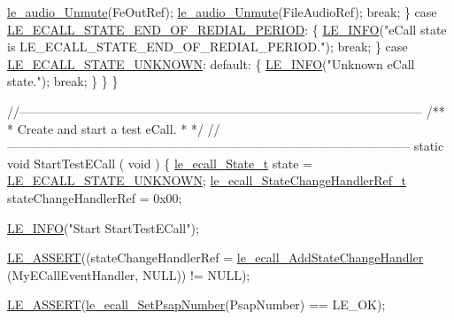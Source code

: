 \begin{DoxyCodeInclude}
{{{{{{{{            \hyperlink{le__audio__interface_8h_adad24547293481964039efe56bc14e2b}{le\_audio\_Unmute}(FeOutRef);
            \hyperlink{le__audio__interface_8h_adad24547293481964039efe56bc14e2b}{le\_audio\_Unmute}(FileAudioRef);
            \textcolor{keywordflow}{break};
        \}
        \textcolor{keywordflow}{case} \hyperlink{le__ecall__interface_8h_a233609e4724e549a1405f9177c0a07ddac5c297a2a70f2490f4f65d72b3a74481}{LE\_ECALL\_STATE\_END\_OF\_REDIAL\_PERIOD}:
        \{
            \hyperlink{le__log_8h_a23e6d206faa64f612045d688cdde5808}{LE\_INFO}(\textcolor{stringliteral}{"eCall state is LE\_ECALL\_STATE\_END\_OF\_REDIAL\_PERIOD."});
            \textcolor{keywordflow}{break};
        \}
        \textcolor{keywordflow}{case} \hyperlink{le__ecall__interface_8h_a233609e4724e549a1405f9177c0a07dda5c06f82cbeeebb121ab56920a67dbc91}{LE\_ECALL\_STATE\_UNKNOWN}:
        \textcolor{keywordflow}{default}:
        \{
            \hyperlink{le__log_8h_a23e6d206faa64f612045d688cdde5808}{LE\_INFO}(\textcolor{stringliteral}{"Unknown eCall state."});
            \textcolor{keywordflow}{break};
        \}
    \}
\}

\textcolor{comment}{//--------------------------------------------------------------------------------------------------}\textcolor{comment}{}
\textcolor{comment}{/**}
\textcolor{comment}{ * Create and start a test eCall.}
\textcolor{comment}{ *}
\textcolor{comment}{ */}
\textcolor{comment}{//--------------------------------------------------------------------------------------------------}
\textcolor{keyword}{static} \textcolor{keywordtype}{void} StartTestECall
(
    \textcolor{keywordtype}{void}
)
\{
    \hyperlink{le__ecall__interface_8h_a233609e4724e549a1405f9177c0a07dd}{le\_ecall\_State\_t}                   state = 
      \hyperlink{le__ecall__interface_8h_a233609e4724e549a1405f9177c0a07dda5c06f82cbeeebb121ab56920a67dbc91}{LE\_ECALL\_STATE\_UNKNOWN};
    \hyperlink{le__ecall__interface_8h_a7e915557fce85b9b82017a80c0d32ddd}{le\_ecall\_StateChangeHandlerRef\_t}   stateChangeHandlerRef = 0x00;

    \hyperlink{le__log_8h_a23e6d206faa64f612045d688cdde5808}{LE\_INFO}(\textcolor{stringliteral}{"Start StartTestECall"});

    \hyperlink{le__log_8h_ac0dbbef91dc0fed449d0092ff0557b39}{LE\_ASSERT}((stateChangeHandlerRef = \hyperlink{le__ecall__interface_8h_a453b64579f2884f1d26981bca38a201c}{le\_ecall\_AddStateChangeHandler}
      (MyECallEventHandler, NULL)) != NULL);

    \hyperlink{le__log_8h_ac0dbbef91dc0fed449d0092ff0557b39}{LE\_ASSERT}(\hyperlink{le__ecall__interface_8h_abf9c09914c55cdbe72df1433f60f6e51}{le\_ecall\_SetPsapNumber}(PsapNumber) == LE\_OK);

}}}}}}}}
\end{DoxyCodeInclude}

